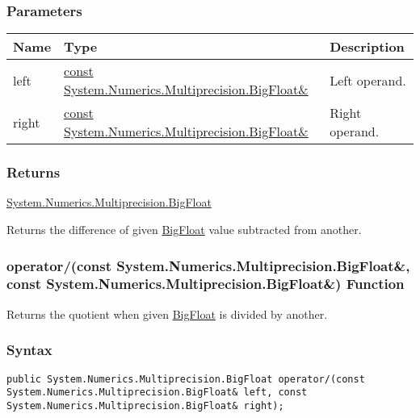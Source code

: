 \documentclass[a4paper,oneside,11.000000pt]{book}
\begin{document}
\subsubsection*{Parameters}
\begin{flushleft}
\begin{supertabular}[l]{!{\raggedright}p{1.30721cm}!{\raggedright}p{8.55945cm}!{\raggedright}p{3.66839cm}}
\textbf{Name}
& \textbf{Type}
& \textbf{Description}
\\
\hline
left
& \hyperlink{System.Numerics.Multiprecision.BigFloat}{const System.\-Numerics.\-Multiprecision.\-BigFloat\&\-}
& Left operand.

\\
right
& \hyperlink{System.Numerics.Multiprecision.BigFloat}{const System.\-Numerics.\-Multiprecision.\-BigFloat\&\-}
& Right operand.

\\
\end{supertabular}

\end{flushleft}
\subsubsection*{Returns}
\hyperlink{System.Numerics.Multiprecision.BigFloat}{System.\-Numerics.\-Multiprecision.\-BigFloat}
\begin{flushleft}
Returns the difference of given \hyperlink{System.Numerics.Multiprecision.BigFloat}{BigFloat} value subtracted from another.

\end{flushleft}
\clearpage

\hypertarget{System.Numerics.Multiprecision.operator.divides.C.R.System.Numerics.Multiprecision.BigFloat.C.R.System.Numerics.Multiprecision.BigFloat}{\subsubsection*{operator/(const System.Numerics.Multiprecision.BigFloat\&, const System.Numerics.Multiprecision.BigFloat\&) Function}}
\begin{flushleft}
Returns the quotient when given \hyperlink{System.Numerics.Multiprecision.BigFloat}{BigFloat} is divided by another.

\end{flushleft}
\subsubsection*{Syntax}
\texttt{public System.Numerics.Multiprecision.BigFloat operator/(const System.Numerics.Multiprecision.BigFloat\& left, const System.Numerics.Multiprecision.BigFloat\& right);}
\end{document}
